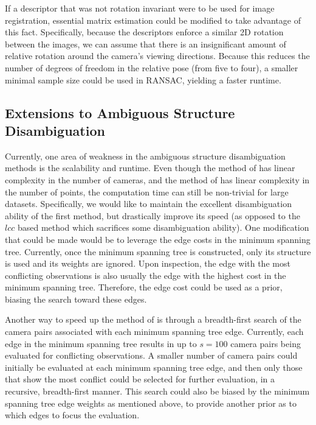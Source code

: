 If a descriptor that was not rotation invariant were to be used for image registration, essential matrix estimation could be modified to take advantage of this fact.
Specifically, because the descriptors enforce a similar 2D rotation between the images, we can assume that there is an insignificant amount of relative rotation around the camera's viewing directions.
Because this reduces the number of degrees of freedom in the relative pose (from five to four), a smaller minimal sample size could be used in RANSAC, yielding a faster runtime.

\subsection{Extensions to Ambiguous Structure Disambiguation}

Currently, one area of weakness in the ambiguous structure disambiguation methods is the scalability and runtime.
Even though the method of  has linear complexity in the number of cameras, and the method of  has linear complexity in the number of points, the computation time can still be non-trivial for large datasets.
Specifically, we would like to maintain the excellent disambiguation ability of the first method, but drastically improve its speed (as opposed to the $lcc$ based method which sacrifices some disambiguation ability).
One modification that could be made would be to leverage the edge costs in the minimum spanning tree.
Currently, once the minimum spanning tree is constructed, only its structure is used and its weights are ignored.
Upon inspection, the edge with the most conflicting observations is also usually the edge with the highest cost in the minimum spanning tree.
Therefore, the edge cost could be used as a prior, biasing the search toward these edges.

Another way to speed up the method of  is through a breadth-first search of the camera pairs associated with each minimum spanning tree edge.
Currently, each edge in the minimum spanning tree results in up to $s=100$ camera pairs being evaluated for conflicting observations.
A smaller number of camera pairs could initially be evaluated at each minimum spanning tree edge, and then only those that show the most conflict could be selected for further evaluation, in a recursive, breadth-first manner.
This search could also be biased by the minimum spanning tree edge weights as mentioned above, to provide another prior as to which edges to focus the evaluation.

